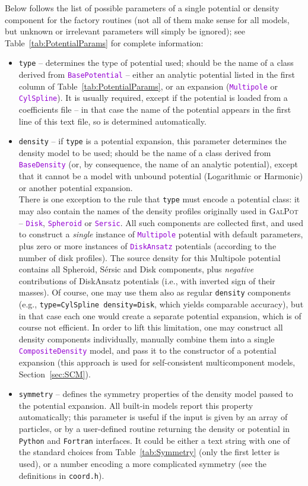 \documentclass[12pt]{article}
\newcommand{\Python}{\texttt{Python}\xspace}
\newcommand{\Fortran}{\texttt{Fortran}\xspace}
\newcommand{\ttt}[1]{\textcolor{darkviolet}{\texttt{#1}}}
\newcommand{\ppp}[1]{\textcolor{darkolive} {\texttt{#1}}}
\begin{document}
Below follows the list of possible parameters of a single potential or density component for the factory routines (not all of them make sense for all models, but unknown or irrelevant parameters will simply be ignored); see Table~\ref{tab:PotentialParams} for complete information:
\begin{itemize}
\item \ppp{type} -- determines the type of potential used; should be the name of a class derived from \ttt{BasePotential} -- either an analytic potential listed in the first column of Table~\ref{tab:PotentialParams}, or an expansion (\ttt{Multipole} or \ttt{CylSpline}). It is usually required, except if the potential is loaded from a coefficients file -- in that case the name of the potential appears in the first line of this text file, so is determined automatically.
\item  \ppp{density} -- if \ppp{type} is a potential expansion, this parameter determines the density model to be used; should be the name of a class derived from \ttt{BaseDensity} (or, by consequence, the name of an analytic potential), except that it cannot be a model with unbound potential (Logarithmic or Harmonic) or another potential expansion.\\
\label{sec:PotentialGalpot}%
There is one exception to the rule that \ppp{type} must encode a potential class: it may also contain the names of the density profiles originally used in \textsc{GalPot} -- \ttt{Disk}, \ttt{Spheroid} or \ttt{Sersic}. All such components are collected first, and used to construct a \textit{single} instance of \ttt{Multipole} potential with default parameters, plus zero or more instances of \ttt{DiskAnsatz} potentials (according to the number of disk profiles). The source density for this Multipole potential contains all Spheroid, S\'ersic and Disk components, plus \textit{negative} contributions of DiskAnsatz potentials (i.e., with inverted sign of their masses). Of course, one may use them also as regular \ppp{density} components (e.g., \ppp{type=CylSpline density=Disk}, which yields comparable accuracy), but in that case each one would create a separate potential expansion, which is of course not efficient. In order to lift this limitation, one may construct all density components individually, manually combine them into a single \ttt{CompositeDensity} model, and pass it to the constructor of a potential expansion (this approach is used for self-consistent multicomponent models, Section~\ref{sec:SCM}).
\item \ppp{symmetry} -- defines the symmetry properties of the density model passed to the potential expansion. All built-in models report this property automatically; this parameter is useful if the input is given by an array of particles, or by a user-defined routine returning the density or potential in \Python and \Fortran interfaces. It could be either a text string with one of the standard choices from Table~\ref{tab:Symmetry} (only the first letter is used), or a number encoding a more complicated symmetry (see the definitions in \texttt{coord.h}).

\end{itemize}
\end{document}
